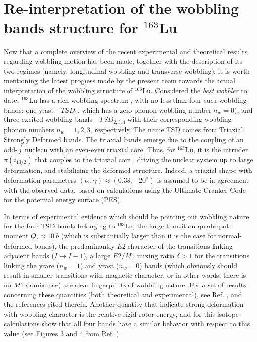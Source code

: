 \documentclass[11pt]{article}
\begin{document}
\section{Re-interpretation of the wobbling bands structure for $^{163}$Lu}

Now that a complete overview of the recent experimental and theoretical results regarding wobbling motion has been made, together with the description of its two regimes (namely, longitudinal wobbling and transverse wobbling), it is worth mentioning the latest progress made by the present team towards the actual interpretation of the wobbling structure of $^{163}$Lu. Considered the \emph{best wobbler} to date, $^{163}$Lu has a rich wobbling spectrum \cite{odegaard2001evidence,jensen2002evidence}, with no less than four such wobbling bands: one yrast - $TSD_1$, which has a zero-phonon wobbling number $n_w=0$), and three excited wobbling bands - $TSD_{2,3,4}$ with their corresponding wobbling phonon numbers $n_w=1,2,3$, respectively. The name TSD comes from Triaxial Strongly Deformed bands. The triaxial bands emerge due to the coupling of an odd-$\vec{j}$ nucleon with an even-even triaxial core. Thus, for $^{163}$Lu, it is the intruder $\pi(i_{13/2})$ that couples to the triaxial core \cite{odegaard2001evidence,hamamoto2002wobbling,jensen2002wobbling}, driving the nuclear system up to large deformation, and stabilizing the deformed structure. Indeed, a triaxial shape with deformation parameters $(\epsilon_2,\gamma)\approx(0.38,+20^\text{o})$ is assumed to be in agreement with the observed data, based on calculations using the Ultimate Cranker Code \cite{bengtsson1990high} for the potential energy surface (PES).

In terms of experimental evidence which should be pointing out wobbling nature for the four TSD bands belonging to $^{163}$Lu, the large transition quadrupole moment $Q_t \approx 10\ b$ \cite{gorgen2004quadrupole} (which is substantially larger than it is the case for normal-deformed bands), the predominantly $E2$ character of the transitions linking adjacent bands ($I\to I-1$), a large $E2/M1$ mixing ratio $\delta>1$ for the transitions linking the yrare ($n_w=1$) and yrast ($n_w=0$) bands (which obviously should result in smaller transitions with magnetic character, or in other words, there is no $M1$ dominance) are clear fingerprints of wobbling nature. For a set of results concerning these quantities (both theoretical and experimental), see Ref. \cite{raduta2017semiclassical}, and the references cited therein. Another quantity that indicate strong deformation with wobbling character is the relative rigid rotor energy, and for this isotope calculations show that all four bands have a similar behavior with respect to this value (see Figures 3 and 4 from Ref. \cite{hagemann2005triaxiality}).
\end{document}
